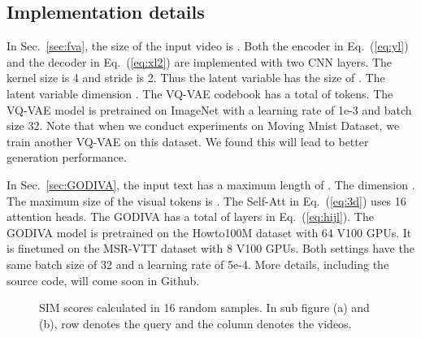 \documentclass{article}
\begin{document}
\subsection{Implementation details}
In Sec.~\ref{sec:fva}, the size of the input video is . Both the encoder  in Eq.~(\ref{eq:yl}) and the decoder  in Eq.~(\ref{eq:xl2}) are implemented with two CNN layers. The kernel size is 4 and stride is 2. Thus the latent variable has the size of . The latent variable dimension . The VQ-VAE codebook has a total of  tokens. The VQ-VAE model is pretrained on ImageNet with a learning rate of 1e-3 and batch size 32. Note that when we conduct experiments on Moving Mnist Dataset, we train another VQ-VAE on this dataset. We found this will lead to better generation performance.

In Sec.~\ref{sec:GODIVA}, the input text has a maximum length of . The dimension . The maximum size of the visual tokens is . The Self-Att in Eq.~(\ref{eq:3d}) uses 16 attention heads. The GODIVA has a total of  layers in Eq.~(\ref{eq:hijl}). The GODIVA model is pretrained on the Howto100M dataset with 64 V100 GPUs. It is finetuned on the MSR-VTT dataset with 8 V100 GPUs. Both settings have the same batch size of 32 and a learning rate of 5e-4. More details, including the source code, will come soon in Github.



\begin{figure}\centering
    \qquad
    \caption{SIM scores calculated in 16 random samples. In sub figure (a) and (b), row denotes the query and the column denotes the videos.}\label{fig:matrix}\end{figure}
\end{document}
